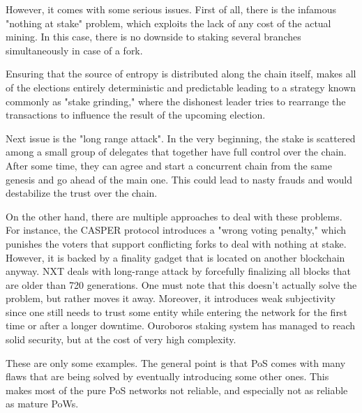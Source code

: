 However, it comes with some serious issues. First of all, there is the infamous "nothing at stake"
\cite{pos_flaws_nothing}
problem, which exploits the lack of any cost of the actual mining. In this case,
there is no downside to staking several branches simultaneously in case of a fork.

Ensuring that the source of entropy is distributed along the chain itself,
makes all of the elections entirely deterministic and predictable leading to a strategy
known commonly as "stake grinding," where the dishonest leader tries to rearrange the
transactions to influence the result of the upcoming election.

Next issue is the "long range attack"\cite{pos_flaws_long}.
In the very beginning, the stake is scattered among a small
group of delegates that together have full control over the chain. After
some time, they can agree and start a concurrent chain from the same genesis
and go ahead of the main one. This could lead to nasty frauds and would
destabilize the trust over the chain.

On the other hand, there are multiple approaches to deal with these problems. For instance,
the CASPER protocol introduces a "wrong voting penalty," which punishes the
voters that support conflicting forks to deal with nothing at stake\cite{casper}.
However, it is backed by a finality gadget that is located on another blockchain
anyway. NXT deals with long-range attack by forcefully
finalizing all blocks that are older than 720 generations\cite{nxt}.
One must note that this doesn't actually solve the problem, but rather moves it
away. Moreover, it introduces weak subjectivity since one still needs to trust
some entity while entering the network for the first time or after a longer
downtime. Ouroboros staking system has managed to reach solid security, but
at the cost of very high complexity\cite{ouroboros}.

These are only some examples. The general point is that PoS comes with many flaws
that are being solved by eventually introducing some other ones. This
makes most of the pure PoS networks not reliable, and especially not as reliable
as mature PoWs.
